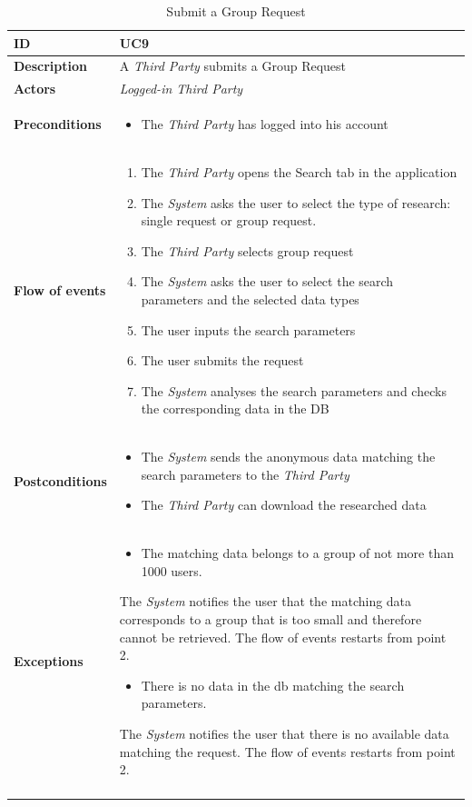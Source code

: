 \documentclass[titlepage]{article}
\begin{document}
\begin{longtable}{| p{3 cm} | p{10 cm} |} 
			\hline
			{\bf ID} & UC9 \\
			\hline
			{\bf Description} & A {\it Third Party} submits a Group Request \\
			\hline
			{\bf Actors} & {\it Logged-in {\it Third Party} }\\
			\hline
			{\bf Preconditions} & 		
							\begin{itemize}
								\item The {\it Third Party} has logged into his account
							\end{itemize}
			\\
			\hline
			{\bf Flow of events} & 
							\begin{enumerate}
								\item The {\it Third Party} opens the Search tab in the application
\item The {\it System} asks the user to select the type of research: single request or group request.
\item The {\it Third Party} selects group request
\item The {\it System} asks the user to select the search parameters and the selected data types
\item The user inputs the search parameters
\item The user submits the request
\item The {\it System} analyses the search parameters and checks the corresponding data in the DB
							\end{enumerate}
			
			 \\
			\hline
			{\bf Postconditions} & 
							\begin{itemize}
								\item The {\it System} sends the anonymous data matching the search parameters to the {\it Third Party}
\item The {\it Third Party} can download the researched data

							\end{itemize}
			\\
			\hline
			{\bf Exceptions} & 
							\begin{itemize}
								\item The matching data belongs to a group of not more than 1000 users.
							\end{itemize}
							The {\it System} notifies the user that the matching data corresponds to a group that is too small and therefore cannot be retrieved. The flow of events restarts from point 2.
							\begin{itemize}
								\item There is no data in the db matching the search parameters.
							\end{itemize}
							The {\it System} notifies the user that there is no available data matching the request. The flow of events restarts from point 2.
							
			\\
			\hline
			\caption{Submit a Group Request}
			\end{longtable}
\end{document}
